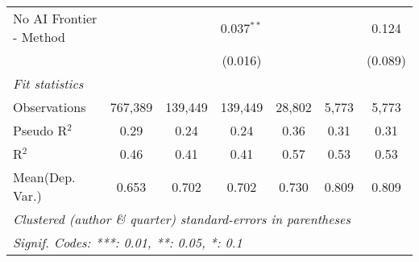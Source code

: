 \begin{tabular}{lcccccc}
   No AI Frontier - Method &               &               & 0.037$^{**}$  &              &         & 0.124\\   
                           &               &               & (0.016)       &              &         & (0.089)\\   
   \midrule
   \emph{Fit statistics}\\
   Observations            & 767,389       & 139,449       & 139,449       & 28,802       & 5,773   & 5,773\\  
   Pseudo R$^2$            & 0.29          & 0.24          & 0.24          & 0.36         & 0.31    & 0.31\\  
   R$^2$                   & 0.46          & 0.41          & 0.41          & 0.57         & 0.53    & 0.53\\  
Mean(Dep. Var.) & 0.653 & 0.702 & 0.702 & 0.730 & 0.809 & 0.809 \\
   \midrule \midrule
   \multicolumn{7}{l}{\emph{Clustered (author \& quarter) standard-errors in parentheses}}\\
   \multicolumn{7}{l}{\emph{Signif. Codes: ***: 0.01, **: 0.05, *: 0.1}}\\
\end{tabular}
\par\endgroup
